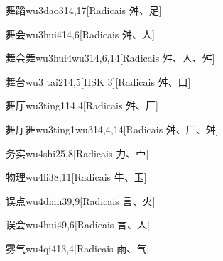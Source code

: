 \begin{entry}{舞蹈}{wu3dao3}{14,17}[Radicais ⾇、⾜]
\end{entry}

\begin{entry}{舞会}{wu3hui4}{14,6}[Radicais ⾇、⼈]
\end{entry}

\begin{entry}{舞会舞}{wu3hui4wu3}{14,6,14}[Radicais ⾇、⼈、⾇]
\end{entry}

\begin{entry}{舞台}{wu3 tai2}{14,5}[HSK 3][Radicais ⾇、⼝]
\end{entry}

\begin{entry}{舞厅}{wu3ting1}{14,4}[Radicais ⾇、⼚]
\end{entry}

\begin{entry}{舞厅舞}{wu3ting1wu3}{14,4,14}[Radicais ⾇、⼚、⾇]
\end{entry}

\begin{entry}{务实}{wu4shi2}{5,8}[Radicais ⼒、⼧]
\end{entry}

\begin{entry}{物理}{wu4li3}{8,11}[Radicais ⽜、⽟]
\end{entry}

\begin{entry}{误点}{wu4dian3}{9,9}[Radicais ⾔、⽕]
\end{entry}

\begin{entry}{误会}{wu4hui4}{9,6}[Radicais ⾔、⼈]
\end{entry}

\begin{entry}{雾气}{wu4qi4}{13,4}[Radicais ⾬、⽓]
\end{entry}


